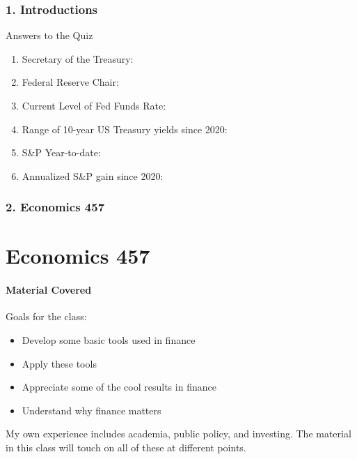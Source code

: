 \documentclass{beamer}
\begin{document}
\begin{frame}[t]
    \frametitle{1. Introductions}

    Answers to the Quiz
    \begin{enumerate}
        \item Secretary of the Treasury:
        \item Federal Reserve Chair:
        \item Current Level of Fed Funds Rate: 
        \item Range of 10-year US Treasury yields since 2020: 
        \item S\&P Year-to-date:
        \item Annualized S\&P gain since 2020: 
    \end{enumerate}

\end{frame}

\begin{frame}[t]
    \frametitle{2. Economics 457}
    \section{Economics 457}
    \framesubtitle{Material Covered}

    Goals for the class:
    \begin{itemize}
        \item Develop some basic tools used in finance
        \item Apply these tools
        \item Appreciate some of the cool results in finance
        \item Understand why finance matters
    \end{itemize}
    \vspace{1em}

    My own experience includes academia, public policy, and investing.   The material in this class will touch on all of these at different points.

\end{frame}
\end{document}
